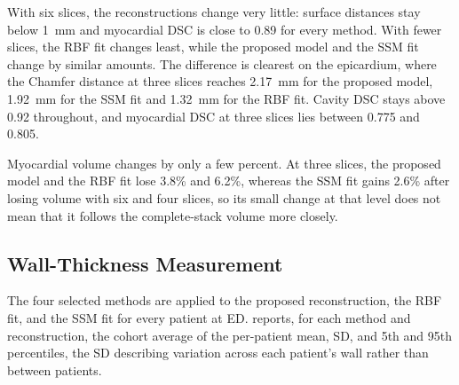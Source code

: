 With six slices, the reconstructions change very little: surface distances
stay below 1~mm and myocardial DSC is close to 0.89 for every method. With
fewer slices, the RBF fit changes least, while the proposed model and the SSM fit
change by similar amounts. The difference is clearest on the epicardium, where
the Chamfer distance at three slices reaches 2.17~mm for the proposed model,
1.92~mm for the SSM fit and 1.32~mm for the RBF fit. Cavity DSC stays
above 0.92 throughout, and myocardial DSC at three slices lies between
0.775 and 0.805.

Myocardial volume changes by only a few percent. At three slices, the proposed model
and the RBF fit lose 3.8\% and 6.2\%, whereas the SSM fit gains 2.6\%
after losing volume with six and four slices, so its small change at that
level does not mean that it follows the complete-stack volume more closely.

\subsection{Wall-Thickness Measurement}
\label{subsec:wall-thickness-results}
\noindent
The four selected methods are applied to the proposed reconstruction, the RBF
fit, and the SSM fit for every patient at ED.
 reports, for each method and reconstruction,
the cohort average of the per-patient mean, SD, and 5th and 95th
percentiles, the SD describing variation across each patient's wall rather
than between patients.

